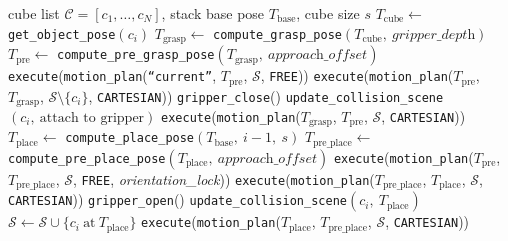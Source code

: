 \documentclass{article}
\begin{document}
\begin{algorithm}[t]
\caption{Block stacking with a robot arm}
\label{alg:block_stacking}
\begin{algorithmic}[1]
\REQUIRE cube list $\mathcal{C} = [c_1, \ldots, c_N]$, stack base pose $T_\text{base}$, cube size $s$
  \STATE $T_\text{cube} \leftarrow$ \texttt{get\_object\_pose}$(c_i)$
  \STATE $T_\text{grasp} \leftarrow$ \texttt{compute\_grasp\_pose}$(T_\text{cube},\ \textit{gripper\_depth})$
  \STATE $T_\text{pre} \leftarrow$ \texttt{compute\_pre\_grasp\_pose}$(T_\text{grasp},\ \textit{approach\_offset})$
  \STATE {}
  \STATE \texttt{execute}(\texttt{motion\_plan}(\texttt{``current''}, $T_\text{pre}$, $\mathcal{S}$, \texttt{FREE}))
  \STATE {}
  \STATE \texttt{execute}(\texttt{motion\_plan}($T_\text{pre}$, $T_\text{grasp}$, $\mathcal{S} \setminus \{c_i\}$, \texttt{CARTESIAN}))
  \STATE \texttt{gripper\_close}()
  \STATE \texttt{update\_collision\_scene}$(c_i,\ \text{attach to gripper})$
  \STATE {}
  \STATE \texttt{execute}(\texttt{motion\_plan}($T_\text{grasp}$, $T_\text{pre}$, $\mathcal{S}$, \texttt{CARTESIAN}))
  \STATE $T_\text{place} \leftarrow$ \texttt{compute\_place\_pose}$(T_\text{base},\ i-1,\ s)$
  \STATE $T_\text{pre\_place} \leftarrow$ \texttt{compute\_pre\_place\_pose}$(T_\text{place},\ \textit{approach\_offset})$
  \STATE {}
  \STATE \texttt{execute}(\texttt{motion\_plan}($T_\text{pre}$, $T_\text{pre\_place}$, $\mathcal{S}$, \texttt{FREE}, \textit{orientation\_lock}))
  \STATE {}
  \STATE \texttt{execute}(\texttt{motion\_plan}($T_\text{pre\_place}$, $T_\text{place}$, $\mathcal{S}$, \texttt{CARTESIAN}))
  \STATE \texttt{gripper\_open}()
  \STATE \texttt{update\_collision\_scene}$(c_i,\ T_\text{place})$
  \STATE $\mathcal{S} \leftarrow \mathcal{S} \cup \{c_i\ \text{at}\ T_\text{place}\}$
  \STATE {}
  \STATE \texttt{execute}(\texttt{motion\_plan}($T_\text{place}$, $T_\text{pre\_place}$, $\mathcal{S}$, \texttt{CARTESIAN}))
\ENDFOR
\end{algorithmic}
\end{algorithm}
\end{document}
